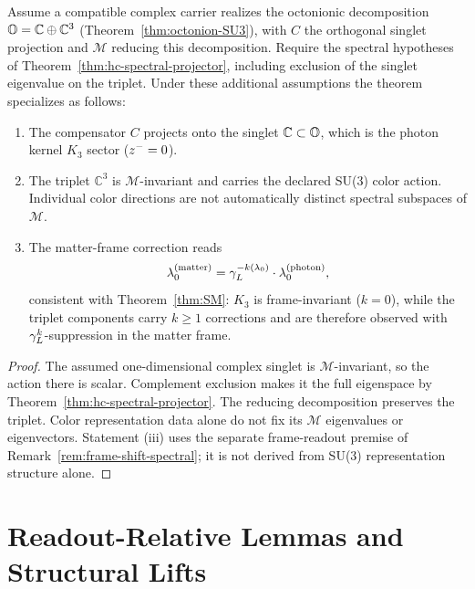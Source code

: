 \begin{corollary}
\label{cor:SM-spectral-realization}
Assume a compatible complex carrier realizes the octonionic decomposition
$\mathbb{O} = \mathbb{C}\oplus\mathbb{C}^3$
(Theorem~\ref{thm:octonion-SU3}), with $C$ the orthogonal singlet
projection and $\mathcal M$ reducing this decomposition. Require the
spectral hypotheses of Theorem~\ref{thm:hc-spectral-projector}, including
exclusion of the singlet eigenvalue on the triplet. Under these additional
assumptions the theorem specializes as follows:
\begin{enumerate}[label=(\roman*)]
  \item The compensator $C$ projects onto the singlet $\mathbb{C}\subset\mathbb{O}$,
  which is the photon kernel $K_3$ sector ($z^-=0$).
  \item The triplet $\mathbb{C}^3$ is $\mathcal{M}$-invariant and carries
  the declared SU(3) color action. Individual color directions are not
  automatically distinct spectral subspaces of $\mathcal M$.
  \item The matter-frame correction reads
  \[
    \lambda_0^{(\mathrm{matter})}
    = \gamma_L^{-k(\lambda_0)}\cdot\lambda_0^{(\mathrm{photon})},
  \]
  consistent with Theorem~\ref{thm:SM}: $K_3$ is frame-invariant
  ($k=0$), while the triplet components carry $k\ge 1$ corrections
  and are therefore observed with $\gamma_L^k$-suppression in the matter frame.
\end{enumerate}
\end{corollary}

\begin{proof}
The assumed one-dimensional complex singlet is $\mathcal M$-invariant,
so the action there is scalar. Complement exclusion makes it the full
eigenspace by Theorem~\ref{thm:hc-spectral-projector}. The reducing
decomposition preserves the triplet. Color representation data alone
do not fix its $\mathcal M$ eigenvalues or eigenvectors. Statement (iii)
uses the separate frame-readout premise of
Remark~\ref{rem:frame-shift-spectral}; it is not derived from SU(3)
representation structure alone.
\end{proof}


\section{Readout-Relative Lemmas and Structural Lifts}
\label{sec:readout-relative-lemmas}

